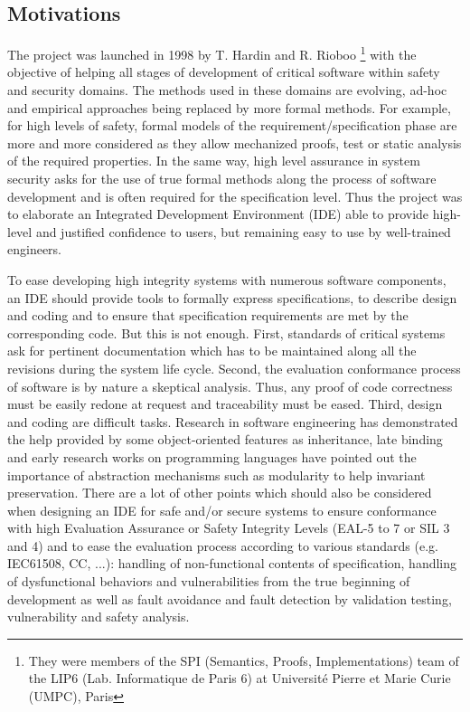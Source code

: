 

\subsection*{Motivations}

The {\foc} project was launched in 1998 by T. Hardin and R. Rioboo
\cite{HardinRiobooTSI04} \footnote{They were members of the SPI (Semantics, Proofs,
Implementations) team of the LIP6 (Lab. Informatique de Paris 6)
at Universit\'e Pierre et Marie Curie (UMPC), Paris}
with the objective of helping all stages of  development of critical software
within safety and security domains. The  methods used in these domains
are evolving, ad-hoc and empirical approaches  being replaced by more formal
methods. For example, for high levels of safety, formal models of the
requirement/specification phase are more and more considered as they
allow mechanized proofs, test or static analysis of the required
properties.  In the same way, high level assurance in system security asks for
the use of true formal methods along the process of software
development and is often required for the specification level.
Thus  the project was to elaborate an Integrated
Development Environment (IDE) able to provide high-level and justified
confidence to users, but remaining easy to use by well-trained
engineers.

To ease developing high integrity systems with numerous software
components, an IDE should provide
tools to formally express specifications, to describe design and
coding and to ensure that specification requirements are met by the
corresponding code. But this is not enough. First, standards of critical systems
ask for pertinent documentation which has to be maintained along all the revisions
during the system life cycle. Second, the evaluation conformance
process of software is by nature a skeptical analysis. Thus, any proof
of code correctness must be easily redone at request and traceability
must be eased. Third, design
and coding are difficult tasks. Research in software engineering has
demonstrated the help provided by some object-oriented
features as inheritance, late binding and early research works on
programming languages have pointed out the importance of abstraction
mechanisms such as modularity to help invariant preservation. There are
a lot of other points which should also be considered when designing
an IDE for safe and/or secure systems to ensure conformance with high
Evaluation Assurance or Safety Integrity Levels (EAL-5 to 7 or SIL 3 and 4)
and to ease the evaluation process according to various standards
(e.g. IEC61508, CC, ...): handling of non-functional contents of
specification, handling of dysfunctional behaviors and vulnerabilities
from the true beginning of development as well as fault avoidance and fault
detection by validation testing, vulnerability and safety analysis.


